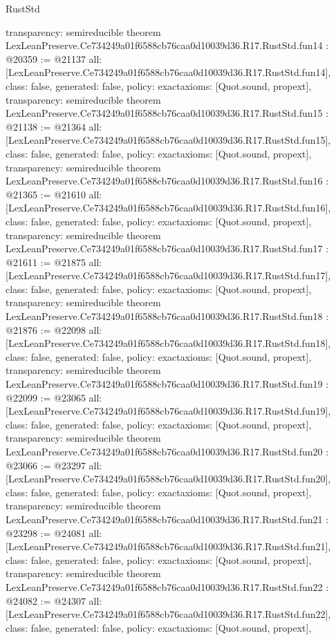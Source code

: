 \begin{lexlean}{RustStd}
\begin{coremodule}
{  transparency: semireducible
}
theorem LexLeanPreserve.Ce734249a01f6588cb76caa0d10039d36.R17.RustStd.fun14 : @20359 := @21137 {
  all: [LexLeanPreserve.Ce734249a01f6588cb76caa0d10039d36.R17.RustStd.fun14],
  class: false,
  generated: false,
  policy: exact{axioms: [Quot.sound, propext]},
  transparency: semireducible
}
theorem LexLeanPreserve.Ce734249a01f6588cb76caa0d10039d36.R17.RustStd.fun15 : @21138 := @21364 {
  all: [LexLeanPreserve.Ce734249a01f6588cb76caa0d10039d36.R17.RustStd.fun15],
  class: false,
  generated: false,
  policy: exact{axioms: [Quot.sound, propext]},
  transparency: semireducible
}
theorem LexLeanPreserve.Ce734249a01f6588cb76caa0d10039d36.R17.RustStd.fun16 : @21365 := @21610 {
  all: [LexLeanPreserve.Ce734249a01f6588cb76caa0d10039d36.R17.RustStd.fun16],
  class: false,
  generated: false,
  policy: exact{axioms: [Quot.sound, propext]},
  transparency: semireducible
}
theorem LexLeanPreserve.Ce734249a01f6588cb76caa0d10039d36.R17.RustStd.fun17 : @21611 := @21875 {
  all: [LexLeanPreserve.Ce734249a01f6588cb76caa0d10039d36.R17.RustStd.fun17],
  class: false,
  generated: false,
  policy: exact{axioms: [Quot.sound, propext]},
  transparency: semireducible
}
theorem LexLeanPreserve.Ce734249a01f6588cb76caa0d10039d36.R17.RustStd.fun18 : @21876 := @22098 {
  all: [LexLeanPreserve.Ce734249a01f6588cb76caa0d10039d36.R17.RustStd.fun18],
  class: false,
  generated: false,
  policy: exact{axioms: [Quot.sound, propext]},
  transparency: semireducible
}
theorem LexLeanPreserve.Ce734249a01f6588cb76caa0d10039d36.R17.RustStd.fun19 : @22099 := @23065 {
  all: [LexLeanPreserve.Ce734249a01f6588cb76caa0d10039d36.R17.RustStd.fun19],
  class: false,
  generated: false,
  policy: exact{axioms: [Quot.sound, propext]},
  transparency: semireducible
}
theorem LexLeanPreserve.Ce734249a01f6588cb76caa0d10039d36.R17.RustStd.fun20 : @23066 := @23297 {
  all: [LexLeanPreserve.Ce734249a01f6588cb76caa0d10039d36.R17.RustStd.fun20],
  class: false,
  generated: false,
  policy: exact{axioms: [Quot.sound, propext]},
  transparency: semireducible
}
theorem LexLeanPreserve.Ce734249a01f6588cb76caa0d10039d36.R17.RustStd.fun21 : @23298 := @24081 {
  all: [LexLeanPreserve.Ce734249a01f6588cb76caa0d10039d36.R17.RustStd.fun21],
  class: false,
  generated: false,
  policy: exact{axioms: [Quot.sound, propext]},
  transparency: semireducible
}
theorem LexLeanPreserve.Ce734249a01f6588cb76caa0d10039d36.R17.RustStd.fun22 : @24082 := @24307 {
  all: [LexLeanPreserve.Ce734249a01f6588cb76caa0d10039d36.R17.RustStd.fun22],
  class: false,
  generated: false,
  policy: exact{axioms: [Quot.sound, propext]},
}
\end{coremodule}
\end{lexlean}
